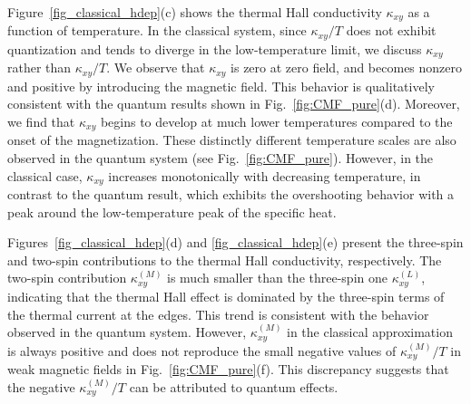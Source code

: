 \documentclass[twocolumn,superscriptaddress,showpacs, longbibliography, aps, prx]{revtex4-2}
\begin{document}
Figure~\ref{fig_classical_hdep}(c) shows the thermal Hall conductivity $\kappa_{xy}$ as a function of temperature.
In the classical system, since $\kappa_{xy}/T$ does not exhibit quantization and tends to diverge in the low-temperature limit, we discuss $\kappa_{xy}$ rather than $\kappa_{xy}/T$.
We observe that $\kappa_{xy}$ is zero at zero field, and becomes nonzero and positive by introducing the magnetic field.  
This behavior is qualitatively consistent with the quantum results shown in Fig.~\ref{fig:CMF_pure}(d).
Moreover, we find that $\kappa_{xy}$ begins to develop at much lower temperatures compared to the onset of the magnetization.
These distinctly different temperature scales are also observed in the quantum system (see Fig.~\ref{fig:CMF_pure}). 
However, in the classical case, $\kappa_{xy}$ increases monotonically with decreasing temperature, in contrast to the quantum result, which exhibits the overshooting behavior with a peak around the low-temperature peak of the specific heat. 

Figures~\ref{fig_classical_hdep}(d) and \ref{fig_classical_hdep}(e) present the three-spin and two-spin contributions to the thermal Hall conductivity, respectively.
The two-spin contribution $\kappa_{xy}^{(M)}$ is much smaller than the three-spin 
one $\kappa_{xy}^{(L)}$, indicating that the thermal Hall effect is dominated by the three-spin terms of the thermal current at the edges.
This trend is consistent with the behavior observed in the quantum system. 
However, $\kappa_{xy}^{(M)}$ in the classical approximation is always positive and does not reproduce the small negative values of $\kappa_{xy}^{(M)}/T$ in weak magnetic fields in Fig.~\ref{fig:CMF_pure}(f). 
This discrepancy suggests that the negative $\kappa_{xy}^{(M)}/T$ can be attributed to quantum effects.
\end{document}
